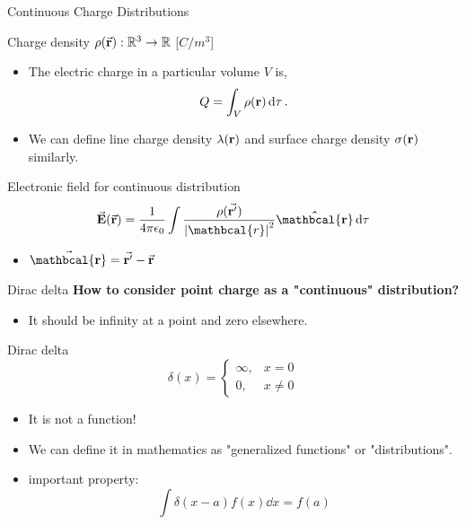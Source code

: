 \documentclass{beamer}
\begin{document}
\begin{frame}{Continuous Charge Distributions}
	\begin{beamerboxesrounded}{Charge density}
		$\rho(\va{r}) : \mathbb{R}^3 \to \mathbb{R}$ [$C/m^3$]
	\end{beamerboxesrounded}

	\begin{itemize}
		\item The electric charge in a particular volume $V$ is,
		\begin{equation}
			Q = \int_V \rho(\vb{r}) \dd{\tau}.
		\end{equation}

		\item We can define line charge density $\lambda(\vb{r})$ and surface charge density $\sigma(\vb{r})$ similarly.
	\end{itemize}

	\begin{beamerboxesrounded}{Electronic field for continuous distribution}
		\begin{equation}
			\va{E} (\va{r}) = \frac{1}{4 \pi \epsilon_0 } \int \frac{\rho(\va{r'})}{\abs{\mathbcal{r}}^2} \vu{\mathbcal{r}} \dd{\tau} 
		\end{equation}
		
	\end{beamerboxesrounded}
	\begin{itemize}
		\item $\va{\mathbcal{r}} = \va{r'} - \va{r}$
	\end{itemize}
\end{frame}

\begin{frame}{Dirac delta}
	\textbf{How to consider point charge as a "continuous" distribution?}
	\begin{itemize}
		\item It should be infinity at a point and zero elsewhere.
	\end{itemize}

	\begin{beamerboxesrounded}{Dirac delta}
		\begin{equation}
			\delta(x) = \begin{cases}
						\infty, & x = 0\\
						0,& x \neq 0
						\end{cases}
		\end{equation}
	\end{beamerboxesrounded}

	\begin{itemize}
		\item It is not a function!
		\item We can define it in mathematics as "generalized functions" or "distributions".
		\item important property: $$\int \delta(x - a) f(x) \dd{x} = f(a) $$
	\end{itemize}
\end{frame}
\end{document}
